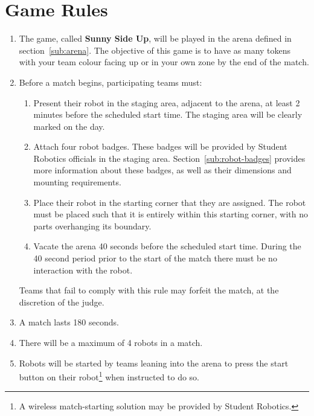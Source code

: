 \section {Game Rules}
\label{game-rules}

\begin{enumerate}
\item The game, called \textbf{Sunny Side Up}, will be played in the arena defined in section~\ref{sub:arena}.
      The objective of this game is to have as many tokens with your team colour facing up or in your own zone by the end of the match.

\item Before a match begins, participating teams must:
\begin {enumerate}
  \item Present their robot in the staging area, adjacent to the arena, at least 2 minutes before the scheduled start time.
        The staging area will be clearly marked on the day.

  \item Attach four robot badges.
        These badges will be provided by Student Robotics officials in the staging area.
        Section~\ref{sub:robot-badges} provides more information about these badges, as well as their dimensions and mounting requirements.

  \item Place their robot in the starting corner that they are assigned.
        The robot must be placed such that it is entirely within this starting corner, with no parts overhanging its boundary.

  \item Vacate the arena 40 seconds before the scheduled start time.
        During the 40 second period prior to the start of the match there must be no interaction with the robot.
\end{enumerate}
  Teams that fail to comply with this rule may forfeit the match, at the discretion of the judge.

\item A match lasts 180 seconds.

\item There will be a maximum of 4 robots in a match.

\item Robots will be started by teams leaning into the arena to press the start button on their robot\footnote{A wireless match-starting solution may be provided by Student Robotics.} when instructed to do so.


\end{enumerate}
